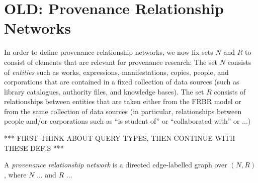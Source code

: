 \section{OLD: Provenance Relationship Networks}

In order to define provenance relationship networks, we now fix sets $N$ and $R$ to consist
of elements that are relevant for provenance research:
The set $N$ consists of \emph{entities} such as 
works, expressions, manifestations, copies, people, and corporations
that are contained in a fixed collection of data sources (such as library catalogues,
authority files, and knowledge bases). The set $R$ consists of relationships
between entities that are taken either from the FRBR model
or from the same collection of data sources (in particular, relationships between people and/or corporations
such as ``is student of'' or ``collaborated with'' or ...)

*** FIRST THINK ABOUT QUERY TYPES, THEN CONTINUE WITH THESE DEF.S ***


A \emph{provenance relationship network} is a directed edge-labelled graph over $(N,R)$,
where $N$ ... and $R$ ... 
